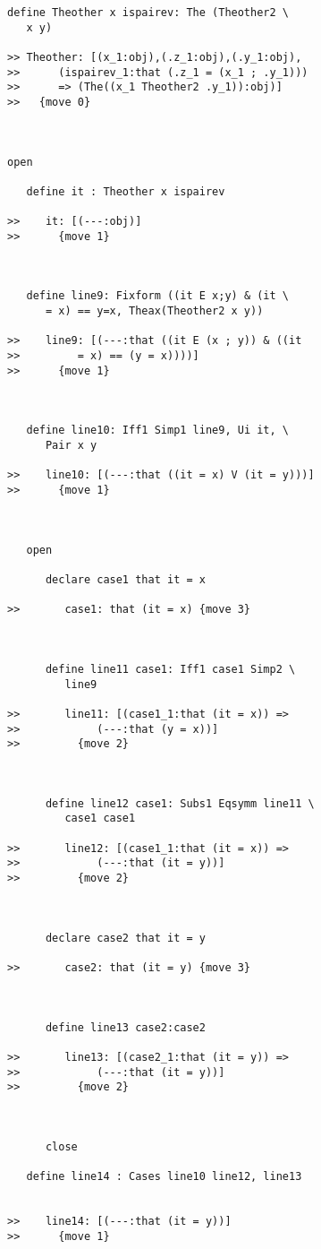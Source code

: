 \documentclass[12pt]{article}
\begin{document}
\begin{verbatim}
define Theother x ispairev: The (Theother2 \
   x y)

>> Theother: [(x_1:obj),(.z_1:obj),(.y_1:obj),
>>      (ispairev_1:that (.z_1 = (x_1 ; .y_1)))
>>      => (The((x_1 Theother2 .y_1)):obj)]
>>   {move 0}



open

   define it : Theother x ispairev

>>    it: [(---:obj)]
>>      {move 1}



   define line9: Fixform ((it E x;y) & (it \
      = x) == y=x, Theax(Theother2 x y))

>>    line9: [(---:that ((it E (x ; y)) & ((it
>>         = x) == (y = x))))]
>>      {move 1}



   define line10: Iff1 Simp1 line9, Ui it, \
      Pair x y

>>    line10: [(---:that ((it = x) V (it = y)))]
>>      {move 1}



   open

      declare case1 that it = x

>>       case1: that (it = x) {move 3}



      define line11 case1: Iff1 case1 Simp2 \
         line9

>>       line11: [(case1_1:that (it = x)) =>
>>            (---:that (y = x))]
>>         {move 2}



      define line12 case1: Subs1 Eqsymm line11 \
         case1 case1

>>       line12: [(case1_1:that (it = x)) =>
>>            (---:that (it = y))]
>>         {move 2}



      declare case2 that it = y

>>       case2: that (it = y) {move 3}



      define line13 case2:case2

>>       line13: [(case2_1:that (it = y)) =>
>>            (---:that (it = y))]
>>         {move 2}



      close

   define line14 : Cases line10 line12, line13


>>    line14: [(---:that (it = y))]
>>      {move 1}




\end{verbatim}
\end{document}
